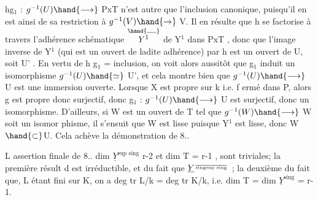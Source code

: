 

hg$_1$ :  $g^{-1}(U) \hand{\longrightarrow}$ PxT  n'est autre que l'inclusion canonique, puisqu'il
en est ainsi de sa restriction à $g^{-1}(V) \hand{\rightarrow}$ V.  
 Il en résulte que h  se factorise
à travers l'adhérence schématique  $\overset{\hand{\rule{1.1em}{0.35pt}}}{Y^1}$ de Y$^1$ dans  PxT , donc que
l'image inverse de Y$^1$ (qui est un ouvert de ladite adhérence) par h
est un ouvert de U, soit U' . En vertu de  h g$_1$ = inclusion, on
voit alors aussitôt que  g$_1$ induit un isomorphisme  $g^{-1}(U) \hand{\simeq}$ U', et
 cela montre bien que  $g^{-1}(U) \hand{\longrightarrow}$ U est une immersion ouverte.
Lorsque X est propre sur k i.e. f ermé dans P, alors  g est propre donc
surjectif, donc  g$_1$ : $g^{-1}(U) \hand{\longrightarrow}$ U est surjectif, donc un isomorphisme.
D'ailleurs, si  W est un ouvert de T tel que  $g^{-1}(W) \hand{\longrightarrow}$ W soit un isomor%
phisme, il s'ensuit que W est lisse puisque Y$^1$ est lisse, donc W$\hand{\subset}$U.
Cela achève la démonstration de 8.. 

  L assertion finale de 8..\hand{,}  dim $\underline{Y}^{\text{sup sing}}$ \over{=}{\unsure{$\leq$}} r-2\hand{,} et
dim T = r-1 , sont triviales;  la première résult d 
   est irréductible, et du fait que
 $\underline{Y}^{\over{\text{sing}}{\text{sup sing}}}$   ; la deuxième du fait que, L étant fini sur K, on a
deg tr L/k = deg tr K/k, i.e.   dim T = dim $\underline{Y}^{\text{sing}}$ = r-1.


